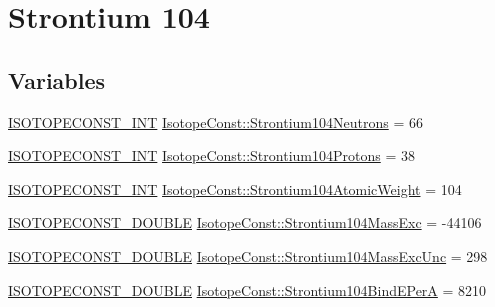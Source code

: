 \hypertarget{group___isotope_const-_strontium-_sr104}{}\section{Strontium 104}
\label{group___isotope_const-_strontium-_sr104}
\subsection*{Variables}
\begin{DoxyCompactItemize}
\item 
\mbox{\hyperlink{group___isotope_const-_macros_ga5f18360b3e99483a35c32d789e62621c}{I\+S\+O\+T\+O\+P\+E\+C\+O\+N\+S\+T\+\_\+\+I\+NT}} \mbox{\hyperlink{group___isotope_const-_strontium-_sr104_ga59431b5420a1393b381db6addf1fe1cd}{Isotope\+Const\+::\+Strontium104\+Neutrons}} = 66
\item 
\mbox{\hyperlink{group___isotope_const-_macros_ga5f18360b3e99483a35c32d789e62621c}{I\+S\+O\+T\+O\+P\+E\+C\+O\+N\+S\+T\+\_\+\+I\+NT}} \mbox{\hyperlink{group___isotope_const-_strontium-_sr104_ga44cab490ac1ee76f43502d702f51f67a}{Isotope\+Const\+::\+Strontium104\+Protons}} = 38
\item 
\mbox{\hyperlink{group___isotope_const-_macros_ga5f18360b3e99483a35c32d789e62621c}{I\+S\+O\+T\+O\+P\+E\+C\+O\+N\+S\+T\+\_\+\+I\+NT}} \mbox{\hyperlink{group___isotope_const-_strontium-_sr104_ga088ea7f3a2a49beee2b30464fd158f19}{Isotope\+Const\+::\+Strontium104\+Atomic\+Weight}} = 104
\item 
\mbox{\hyperlink{group___isotope_const-_macros_ga8f45a7272ce02c0b4c65c44636ed719a}{I\+S\+O\+T\+O\+P\+E\+C\+O\+N\+S\+T\+\_\+\+D\+O\+U\+B\+LE}} \mbox{\hyperlink{group___isotope_const-_strontium-_sr104_gafcc305d074aba67984958bd7ea9c2eea}{Isotope\+Const\+::\+Strontium104\+Mass\+Exc}} = -\/44106
\item 
\mbox{\hyperlink{group___isotope_const-_macros_ga8f45a7272ce02c0b4c65c44636ed719a}{I\+S\+O\+T\+O\+P\+E\+C\+O\+N\+S\+T\+\_\+\+D\+O\+U\+B\+LE}} \mbox{\hyperlink{group___isotope_const-_strontium-_sr104_gaa31e098b386477b888ebaba9935ac003}{Isotope\+Const\+::\+Strontium104\+Mass\+Exc\+Unc}} = 298
\item 
\mbox{\hyperlink{group___isotope_const-_macros_ga8f45a7272ce02c0b4c65c44636ed719a}{I\+S\+O\+T\+O\+P\+E\+C\+O\+N\+S\+T\+\_\+\+D\+O\+U\+B\+LE}} \mbox{\hyperlink{group___isotope_const-_strontium-_sr104_ga4a8a71c4f85d88107a19ce6375ae27e4}{Isotope\+Const\+::\+Strontium104\+Bind\+E\+PerA}} = 8210
\item 

\end{DoxyCompactItemize}
